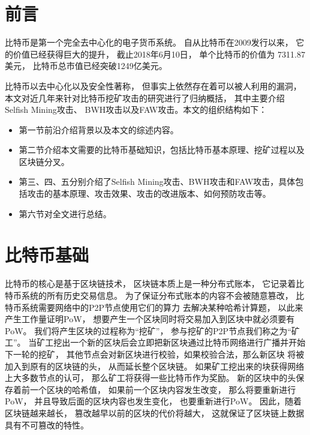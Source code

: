 \documentclass[a4paper, 11pt]{article}
\begin{document}
\begin{CJK*}{UTF8}{gbsn}
\begin{abstract}
        

    \end{abstract}

    \section{前言}

    \indent

    比特币\cite{ref_article1}是第一个完全去中心化的电子货币系统。
    自从比特币在2009发行以来，
    它的价值已经获得巨大的提升，
    截止2018年6月10日，
    单个比特币的价值为
    7311.87美元，
    比特币总市值已经突破1249亿美元\cite{ref_web1}。


    比特币以去中心化以及安全性著称，
    但事实上依然存在着可以被人利用的漏洞，
    本文对近几年来针对比特币挖矿攻击的研究进行了归纳概括，
    其中主要介绍Selfish Mining攻击\cite{ref_selfish_mining1, ref_selfish_mining2, ref_selfish_mining3}、
    BWH攻击\cite{ref_BWH1, ref_BWH2, ref_article3}以及FAW攻击\cite{ref_FAW}。本文的组织结构如下：
    \begin{itemize}
        \item 第一节前沿介绍背景以及本文的综述内容。
        \item 第二节介绍本文需要的比特币基础知识，包括比特币基本原理、挖矿过程以及区块链分叉。
        \item 第三、四、五分别介绍了Selfish Mining攻击、BWH攻击和FAW攻击，具体包括攻击的基本原理、攻击效果、攻击的改进版本、如何预防攻击等。
        \item 第六节对全文进行总结。

    \end{itemize}

    \section{比特币基础}

    \indent
    
    比特币的核心是基于区块链技术，
    区块链本质上是一种分布式账本，
    它记录着比特币系统的所有历史交易信息。
    为了保证分布式账本的内容不会被随意篡改，
    比特币系统需要网络中的P2P节点使用它们的算力
    去解决某种哈希计算题，
    以此来产生工作量证明PoW，
    想要产生一个区块同时将交易加入到区块中就必须要有PoW。
    我们将产生区块的过程称为“挖矿”，
    参与挖矿的P2P节点我们称之为“矿工”。
    当矿工挖出一个新的区块后会立即把新区块通过比特币网络进行广播并开始下一轮的挖矿，
    其他节点会对新区块进行校验，如果校验合法，那么新区块
    将被加入到原有的区块链的头，
    从而延长整个区块链。
    如果矿工挖出来的块获得网络上大多数节点的认可，
    那么矿工将获得一些比特币作为奖励。
    新的区块中的头保存着前一个区块的哈希值，
    如果前一个区块内容发生改变，
    那么将要重新进行PoW，
    并且导致后面的区块内容也发生变化，
    也要重新进行PoW。
    因此，随着区块链越来越长，
    篡改越早以前的区块的代价将越大，
    这就保证了区块链上数据具有不可篡改的特性。



\end{CJK*}
\end{document}
